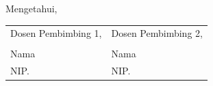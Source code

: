 \vspace{0.3cm}

\begin{center}
Mengetahui,
\end{center}

\vspace{0.3cm}

\noindent
\begin{tabular}{@{}p{7cm}@{}p{7cm}@{}}
    \centering Dosen Pembimbing 1, & \centering Dosen Pembimbing 2, \tabularnewline
    & \\[1.5cm]
    \centering Nama & \centering Nama \tabularnewline
    \centering NIP. & \centering NIP. \tabularnewline
\end{tabular}